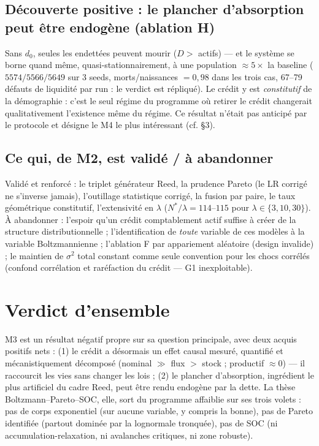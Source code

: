 \documentclass[11pt,a4paper]{article}
\begin{document}
\subsection{Découverte positive : le plancher d'absorption peut être
endogène (ablation H)}
Sans $d_0$, seules les endettées peuvent mourir ($D >$ actifs) — et le
système se borne quand même, quasi-stationnairement, à une population
$\approx 5\times$ la baseline ($5574/5566/5649$ sur 3 seeds,
morts/naissances $= 0{,}98$ dans les trois cas, 67--79 défauts de
liquidité par run : le verdict est répliqué). Le crédit y est
\emph{constitutif} de la démographie : c'est le seul régime du programme où
retirer le crédit changerait qualitativement l'existence même du régime.
Ce résultat n'était pas anticipé par le protocole et désigne le M4 le plus
intéressant (cf. §3).

\subsection{Ce qui, de M2, est validé / à abandonner}
Validé et renforcé : le triplet générateur Reed, la prudence Pareto (le LR
corrigé ne s'inverse jamais), l'outillage statistique corrigé, la fusion
par paire, le taux géométrique constitutif, l'extensivité en $\lambda$
($N^*/\lambda = 114$--$115$ pour $\lambda \in \{3, 10, 30\}$). À
abandonner : l'espoir qu'un crédit comptablement actif suffise à créer de
la structure distributionnelle ; l'identification de \emph{toute} variable
de ces modèles à la variable Boltzmannienne ; l'ablation F par appariement
aléatoire (design invalide) ; le maintien de $\sigma^2$ total constant
comme seule convention pour les chocs corrélés (confond corrélation et
raréfaction du crédit — G1 inexploitable).

\section{Verdict d'ensemble}

M3 est un résultat négatif propre sur sa question principale, avec deux
acquis positifs nets : (1) le crédit a désormais un effet causal mesuré,
quantifié et mécanistiquement décomposé (nominal $\gg$ flux $>$ stock ;
productif $\approx 0$) — il raccourcit les vies sans changer les lois ;
(2) le plancher d'absorption, ingrédient le plus artificiel du cadre Reed,
peut être rendu endogène par la dette. La thèse Boltzmann--Pareto--SOC,
elle, sort du programme affaiblie sur ses trois volets : pas de corps
exponentiel (sur aucune variable, y compris la bonne), pas de Pareto
identifiée (partout dominée par la lognormale tronquée), pas de SOC (ni
accumulation-relaxation, ni avalanches critiques, ni zone robuste).
\end{document}
